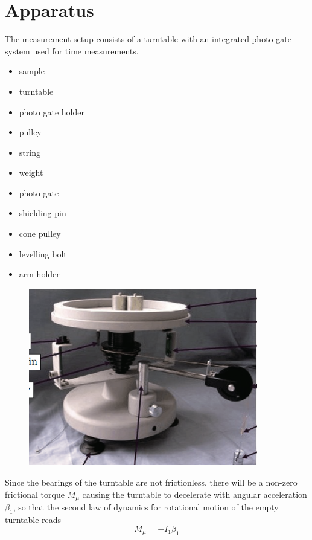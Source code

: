 \documentclass[12pt,a4paper]{article}
\begin{document}
\section{Apparatus}
The measurement setup consists of a turntable with an integrated photo-gate
system used for time measurements.
\singlespacing
\begin{itemize}
\item sample
\item turntable
\item photo gate holder
\item pulley
\item string
\item weight
\item photo gate
\item shielding pin
\item cone pulley
\item levelling bolt
\item arm holder
\end{itemize}
\doublespacing

\begin{figure}[H]
\centering
\includegraphics[width=10cm]{fig/app/turntable}
\end{figure}

Since the bearings of the turntable are not frictionless, there will be a
non-zero frictional torque $M_μ$ causing the turntable to decelerate with
angular acceleration $\beta_1$, so that the second law of dynamics for
rotational motion of the empty turntable reads $$   M_\mu = -I_1\beta_1  $$
\end{document}
